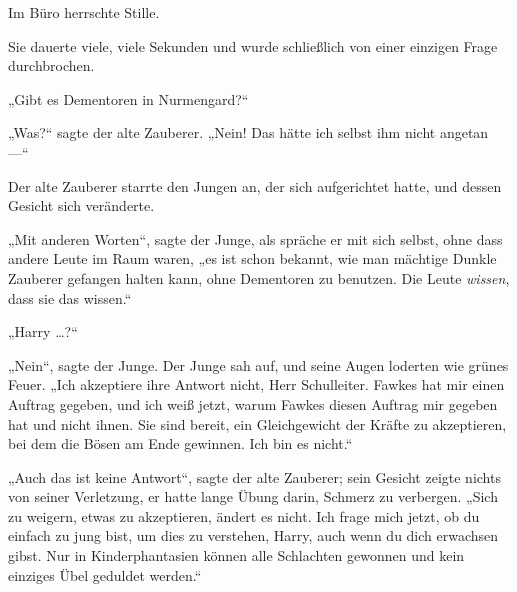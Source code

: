 Im Büro herrschte Stille.

Sie dauerte viele, viele Sekunden und wurde schließlich von einer einzigen Frage durchbrochen.

„Gibt es Dementoren in Nurmengard?“

„Was?“ sagte der alte Zauberer.
„Nein! Das hätte ich selbst ihm nicht angetan —“

\later

Der alte Zauberer starrte den Jungen an, der sich aufgerichtet hatte, und dessen Gesicht sich veränderte.

„Mit anderen Worten“, sagte der Junge, als spräche er mit sich selbst, ohne dass andere Leute im Raum waren, „es ist schon bekannt, wie man mächtige Dunkle Zauberer gefangen halten kann, ohne Dementoren zu benutzen. Die Leute \emph{wissen}, dass sie das wissen.“

„Harry …?“

„Nein“, sagte der Junge. Der Junge sah auf, und seine Augen loderten wie grünes Feuer.
„Ich akzeptiere ihre Antwort nicht, Herr Schulleiter. Fawkes hat mir einen Auftrag gegeben, und ich weiß jetzt, warum Fawkes diesen Auftrag mir gegeben hat und nicht ihnen. Sie sind bereit, ein Gleichgewicht der Kräfte zu akzeptieren, bei dem die Bösen am Ende gewinnen. Ich bin es nicht.“

„Auch das ist keine Antwort“, sagte der alte Zauberer; sein Gesicht zeigte nichts von seiner Verletzung, er hatte lange Übung darin, Schmerz zu verbergen.
„Sich zu weigern, etwas zu akzeptieren, ändert es nicht. Ich frage mich jetzt, ob du einfach zu jung bist, um dies zu verstehen, Harry, auch wenn du dich erwachsen gibst. Nur in Kinderphantasien können alle Schlachten gewonnen und kein einziges Übel geduldet werden.“

